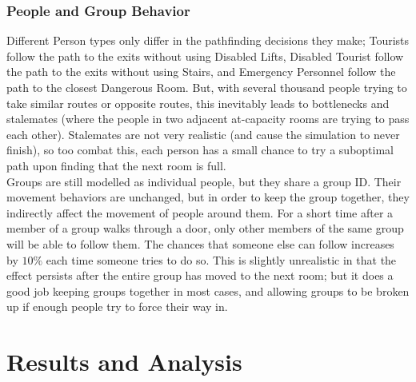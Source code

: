 \documentclass[12pt]{article}
\begin{document}
\subsubsection{People and Group Behavior}
Different Person types only differ in the pathfinding decisions they make; Tourists follow the path to the exits without using Disabled Lifts, Disabled Tourist follow the path to the exits without using Stairs, and Emergency Personnel follow the path to the closest Dangerous Room. But, with several thousand people trying to take similar routes or opposite routes, this inevitably leads to bottlenecks and stalemates (where the people in two adjacent at-capacity rooms are trying to pass each other). Stalemates are not very realistic (and cause the simulation to never finish), so too combat this, each person has a small chance to try a suboptimal path upon finding that the next room is full.\\

Groups are still modelled as individual people, but they share a group ID. Their movement behaviors are unchanged, but in order to keep the group together, they indirectly affect the movement of people around them. For a short time after a member of a group walks through a door, only other members of the same group will be able to follow them. The chances that someone else can follow increases by $10\%$ each time someone tries to do so. This is slightly unrealistic in that the effect persists after the entire group has moved to the next room; but it does a good job keeping groups together in most cases, and allowing groups to be broken up if enough people try to force their way in.

\section{Results and Analysis}
\end{document}
